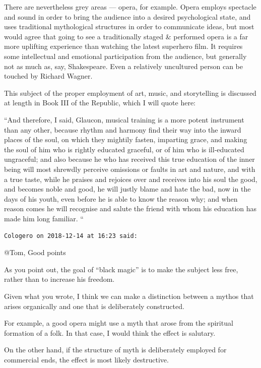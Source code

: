\begin{footnotesize}
\begin{sffamily}
There are nevertheless grey areas --- opera, for example. Opera employs spectacle and sound in order to bring the audience into a desired psychological state, and uses traditional mythological structures in order to communicate ideas, but most would agree that going to see a traditionally staged \& performed opera is a far more uplifting experience than watching the latest superhero film. It requires some intellectual and emotional participation from the audience, but generally not as much as, say, Shakespeare. Even a relatively uncultured person can be touched by Richard Wagner.

This subject of the proper employment of art, music, and storytelling is discussed at length in Book III of the Republic, which I will quote here:

``And therefore, I said, Glaucon, musical training is a more potent instrument than any other, because rhythm and harmony find their way into the inward places of the soul, on which they mightily fasten, imparting grace, and making the soul of him who is rightly educated graceful, or of him who is ill-educated ungraceful; and also because he who has received this true education of the inner being will most shrewdly perceive omissions or faults in art and nature, and with a true taste, while he praises and rejoices over and receives into his soul the good, and becomes noble and good, he will justly blame and hate the bad, now in the days of his youth, even before he is able to know the reason why; and when reason comes he will recognise and salute the friend with whom his education has made him long familiar. ``

\hfill

\texttt{Cologero on 2018-12-14 at 16:23 said:}

@Tom, Good points

As you point out, the goal of ``black magic'' is to make the subject less free, rather than to increase his freedom.

Given what you wrote, I think we can make a distinction between a mythos that arises organically and one that is deliberately constructed.

For example, a good opera might use a myth that arose from the spiritual formation of a folk. In that case, I would think the effect is salutary.

On the other hand, if the structure of myth is deliberately employed for commercial ends, the effect is most likely destructive.

\end{sffamily}
\end{footnotesize}

